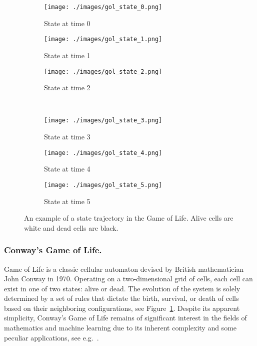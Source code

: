 \documentclass[letterpaper]{article} %
\begin{document}
\begin{figure}[t]
    \centering
    \begin{subfigure}{.32\linewidth}
        \texttt{[image: ./images/gol\_state\_0.png]}
        \caption{State at time 0}
    \end{subfigure}
    \begin{subfigure}{.32\linewidth}
        \texttt{[image: ./images/gol\_state\_1.png]}
        \caption{State at time 1}
    \end{subfigure}
    \begin{subfigure}{.32\linewidth}
        \texttt{[image: ./images/gol\_state\_2.png]}
        \caption{State at time 2}
    \end{subfigure}
    \\
    \begin{subfigure}{.32\linewidth}
        \texttt{[image: ./images/gol\_state\_3.png]}
        \caption{State at time 3}
    \end{subfigure}
    \begin{subfigure}{.32\linewidth}
        \texttt{[image: ./images/gol\_state\_4.png]}
        \caption{State at time 4}
    \end{subfigure}
    \begin{subfigure}{.32\linewidth}
        \texttt{[image: ./images/gol\_state\_5.png]}
        \caption{State at time 5}
    \end{subfigure}
    \caption{An example of a state trajectory in the Game of Life.
             Alive cells are white and dead cells are black.}
    \label{fig:gol_states}
\end{figure}


\subsubsection{Conway's Game of Life.}
Game of Life is a classic cellular automaton devised by British mathematician John Conway in 1970.
Operating on a two-dimensional grid of cells, each cell can exist in one of two states: alive or dead.
The evolution of the system is solely determined by a set of rules that dictate the birth, survival, or death of cells based on their neighboring configurations, see Figure~\ref{fig:gol_states}.
Despite its apparent simplicity, Conway's Game of Life remains of significant interest in the fields of mathematics and machine learning due to its inherent complexity and some peculiar applications, see e.g.~\cite{rennard2002implementation, rendell2011universal}.
\end{document}
